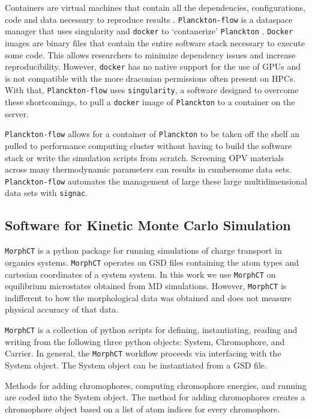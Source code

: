 Containers are virtual machines that contain all the dependencies, configurations, code and data 
necessary to reproduce results \cite{Cito2016a}. 
\texttt{Planckton-flow} is a dataspace manager that uses
singularity \cite{singularity2017} and \texttt{docker} \cite{Merkel:2014:DLL:2600239.2600241} 
to `contanerize' \texttt{Planckton} \cite{cmelab}. \texttt{Docker} images are binary files that contain the
entire software stack necessary to execute some code. This allows researchers to minimize dependency issues
and increase reproducibility. However, \texttt{docker} has no native support for the use of GPUs and is not
compatible with the more draconian permissions often present on HPCs. With that, \texttt{Planckton-flow} uses 
\texttt{singularity}, a software designed to overcome these shortcomings,
to pull a \texttt{docker} image of \texttt{Planckton} to a container on the server. 

\texttt{Planckton-flow} allows for a container of \texttt{Planckton} to be taken 
off the shelf an pulled to performance computing cluster without having to build the software stack or write the
simulation scripts from scratch. Screening OPV materials across many thermodynamic parameters can results in
cumbersome data sets. \texttt{Planckton-flow} automates the management of large these large multidimensional
data sets with \texttt{signac}.

\subsection{Software for Kinetic Monte Carlo Simulation}
\label{morphct}

\texttt{MorphCT} is a python package for running  simulations of 
charge transport in organics systems.
\texttt{MorphCT} operates on GSD files containing the atom types and cartesian
coordinates of a system
system. In this work we use \texttt{MorphCT} on equilibrium microstates obtained from MD simulations. However,
\texttt{MorphCT} is indifferent to how the morphological data was obtained and does not measure physical
accuracy of that data. 

\texttt{MorphCT} is a collection of python scripts for defining, instantiating, reading
and writing from the following three python objects: System, Chromophore, and
Carrier. 
In general, the \texttt{MorphCT} workflow proceeds via interfacing with the
System object. The System object can be instantiated from a GSD file. 

Methods for adding chromophores, computing chromophore energies, and running
 are coded into the System object. 
The method for adding chromophores creates a chromophore object based on a list
of atom indices for every chromophore. 
 
